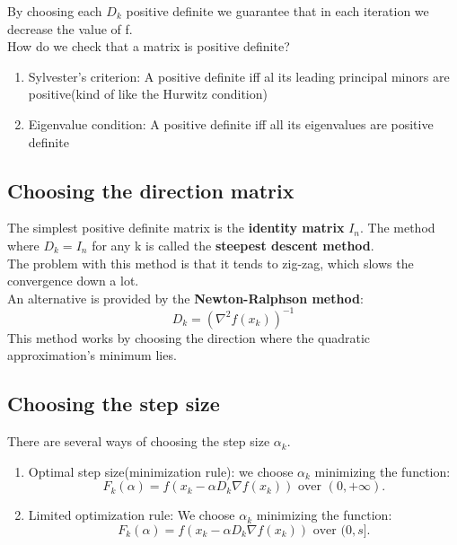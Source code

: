 \cor{}
{
    By choosing each $D_k$ positive definite we guarantee that in each iteration we decrease the value of f.\\
    How do we check that a matrix is positive definite?
    \begin{enumerate}
        \item Sylvester's criterion: A positive definite iff al its leading principal minors are positive(kind of like the Hurwitz condition)
        \item Eigenvalue condition: A positive definite iff all its eigenvalues are positive definite
    \end{enumerate}
}

\subsection{Choosing the direction matrix}
The simplest positive definite matrix is the \textbf{identity matrix} $I_n$. The method where  $D_k = I_n$ for any k is called the \textbf{steepest descent method}.
\\
The problem with this method is that it tends to zig-zag, which slows the convergence down a lot. \\
An alternative is provided by the \textbf{Newton-Ralphson method}:
 \begin{equation}
    D_k = \left( \nabla^{2} f(x_k) \right)^{-1}
\end{equation}
This method works by choosing the direction where the quadratic approximation's minimum lies.

\subsection{Choosing the step size}
There are several ways of choosing the step size $\alpha_k$.
\begin{enumerate}
    \item Optimal step size(minimization rule):
        we choose $\alpha_k$ minimizing the function:
         \[
             F_k(\alpha) = f(x_k - \alpha D_k \nabla f(x_k))\text{ over } (0,+\infty)
        .\] 
    \item Limited optimization rule:
        We choose $\alpha_k$ minimizing the function:
         \[
             F_k(\alpha) = f(x_k - \alpha D_k \nabla f(x_k)) \text{ over } (0,s]
        .\] 
\end{enumerate}


